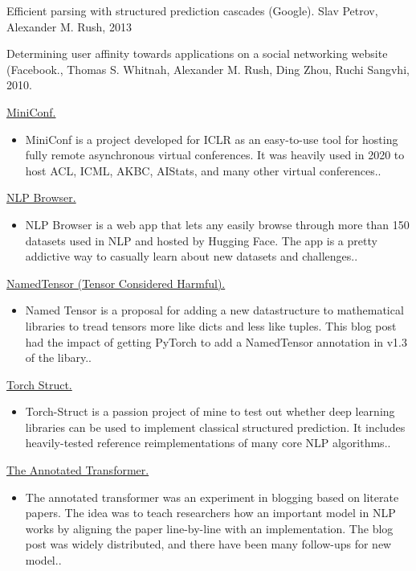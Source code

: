 \documentclass[10pt]{article}
\begin{document}
\ind Efficient parsing with structured prediction cascades (Google). Slav Petrov, Alexander M. Rush, 2013
\medskip

\ind  Determining user affinity towards applications on a social networking website (Facebook., Thomas S. Whitnah, Alexander M. Rush, Ding Zhou, Ruchi Sangvhi, 2010.



\bigskip


\bigskip

\ind \href{ paper.link } { MiniConf. } 
\begin{itemize}
\item MiniConf is a project developed for ICLR as an easy-to-use tool for hosting fully remote asynchronous virtual conferences. It was heavily used in 2020 to host ACL, ICML, AKBC, AIStats, and many other virtual conferences.. 
\end{itemize}
\medskip


\ind \href{ paper.link } { NLP Browser. } 
\begin{itemize}
\item NLP Browser is a web app that lets any easily browse through more than 150 datasets used in NLP and hosted by Hugging Face. The app is a pretty addictive way to casually learn about new datasets and challenges.. 
\end{itemize}
\medskip


\ind \href{ paper.link } { NamedTensor (Tensor Considered Harmful). } 
\begin{itemize}
\item Named Tensor is a proposal for adding a new datastructure to mathematical libraries to tread tensors more like dicts and less like tuples. This blog post had the impact of getting PyTorch to add a NamedTensor annotation in v1.3 of the libary.. 
\end{itemize}
\medskip


\ind \href{ paper.link } { Torch Struct. } 
\begin{itemize}
\item Torch-Struct is a passion project of mine to test out whether deep learning libraries can be used to implement classical structured prediction. It includes heavily-tested reference reimplementations of many core NLP algorithms.. 
\end{itemize}
\medskip


\ind \href{ paper.link } { The Annotated Transformer. } 
\begin{itemize}
\item The annotated transformer was an experiment in blogging based on literate papers. The idea was to teach researchers how an important model in NLP works by aligning the paper line-by-line with an implementation. The blog post was widely distributed, and there have been many follow-ups for new model.. 
\end{itemize}
\medskip
\end{document}
